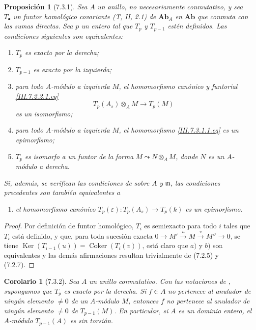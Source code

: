\documentclass[10pt,oneside,openany]{book}
\theoremstyle{egaenv}\newtheorem*{env}{---}
\theoremstyle{egastatement}
\newtheorem*{proposition}{Proposición}
\newtheorem*{corollary}{Corolario}
\theoremstyle{egadescription}
\newcommand{\oldpage}[2][]{\marginnote{\normalfont\scriptsize\textbf{#1}\,|\,#2}\ignorespaces}
\begin{document}
\begin{proposition}[7.3.1]
\label{III.7.3.1}
Sea $A$ un anillo, no necesariamente conmutativo, y sea
$T_\bullet$ un funtor homológico covariante
\emph{(T, II, 2.1)} de $\boldsymbol{Ab}_A$ en $\boldsymbol{Ab}$ que
conmuta con las sumas directas. Sea $p$ un entero tal que
$T_p$ y $T_{p-1}$ estén definidos. Las condiciones siguientes son
equivalentes:
\begin{enumerate}
  \item[(a)] $T_p$ es exacto por la derecha;
  \item[(b)] $T_{p-1}$ es exacto por la izquierda;

\oldpage[III]{181}

  \item[(c)] para todo $A$-módulo a izquierda $M$, el homomorfismo
    canónico y funtorial \eqref{III.7.2.2.1.eq}
    \[
      T_p(A_s)\otimes_A M\longrightarrow T_p(M)
      \tag{7.3.1.1}\label{III.7.3.1.1.fr}
    \]
    es un isomorfismo;
  \item[(d)] para todo $A$-módulo a izquierda $M$, el homomorfismo
    \eqref{III.7.3.1.1.eq} es un epimorfismo;
  \item[(e)] $T_p$ es isomorfo a un funtor de la forma
    $M\leadsto N\otimes_A M$,
    donde $N$ es un $A$-módulo a derecha.
\end{enumerate}
Si, además, se verifican las condiciones de  sobre
$A$ y $\mathfrak m$, las condiciones precedentes son también
equivalentes a
\begin{enumerate}
  \item[(f)] el homomorfismo canónico
    $T_p(\varepsilon):T_p(A_s)\longrightarrow T_p(k)$
    es un epimorfismo.
\end{enumerate}
\end{proposition}

\begin{proof}
Por definición de funtor homológico, $T_i$ es semiexacto para todo
$i$ tales que $T_i$ está definido, y que, para toda sucesión exacta
$0\longrightarrow M'\xrightarrow{u}M\xrightarrow{v}M''\longrightarrow0$,
se tiene
$\operatorname{Ker}(T_{i-1}(u))=\operatorname{Coker}(T_i(v))$,
está claro que $a)$ y $b)$ son equivalentes y las demás afirmaciones
resultan trivialmente de (7.2.5) y (7.2.7).
\end{proof}

\begin{corollary}[7.3.2]
\label{III.7.3.2}
Sea $A$ un anillo conmutativo. Con las notaciones de
, supongamos que $T_p$ es exacto por la derecha. Si
$f\in A$ no pertenece al anulador de ningún elemento
$\ne0$ de un $A$-módulo $M$, entonces $f$ no pertenece al anulador de ningún
elemento $\ne0$ de $T_{p-1}(M)$. En particular, si $A$ es un
dominio entero, el $A$-módulo $T_{p-1}(A)$ es sin torsión.
\end{corollary}
\end{document}
